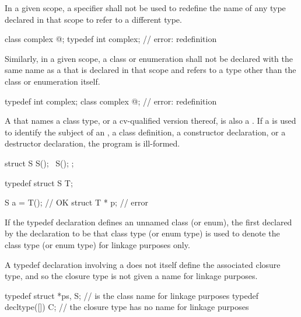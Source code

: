\pnum
In a given scope, a  specifier shall not be used to
redefine the name of any type declared in that scope to refer to a
different type.
\begin{example}
\begin{codeblock}
class complex { @\commentellip@ };
typedef int complex;            // error: redefinition
\end{codeblock}
\end{example}

\pnum
Similarly, in a given scope, a class or enumeration shall not be
declared with the same name as a  that is
declared in that scope and refers to a type other than the class or
enumeration itself.
\begin{example}
\begin{codeblock}
typedef int complex;
class complex { @\commentellip@ };    // error: redefinition
\end{codeblock}
\end{example}

\pnum
\begin{note}
%
A  that names a class type, or a cv-qualified
version thereof, is also a . If
a  is used to identify the subject of an
, a class
definition, a constructor
declaration, or a destructor
declaration, the program is ill-formed.
\end{note}
\begin{example}

\begin{codeblock}
struct S {
  S();
  ~S();
};

typedef struct S T;

S a = T();                      // OK
struct T * p;                   // error
\end{codeblock}
\end{example}

\pnum
{}%
%
%
If the typedef declaration defines an unnamed class (or enum), the first
 declared by the declaration to be that class
type (or enum type) is used to denote the class type (or enum type) for
linkage purposes only.
\begin{note}
A typedef declaration involving a 
does not itself define the associated closure type,
and so the closure type is not given a name for linkage purposes.
\end{note}
\begin{example}
\begin{codeblock}
typedef struct { } *ps, S;      //  is the class name for linkage purposes
typedef decltype([]{}) C;       // the closure type has no name for linkage purposes
\end{codeblock}
\end{example}

